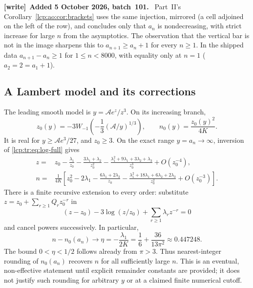 \documentclass[11pt]{article}
\numberwithin{equation}{section}
\theoremstyle{definition}\newtheorem{definition}[theorem]{Definition}
\theoremstyle{remark}\newtheorem{remark}[theorem]{Remark}
\newenvironment{writenote}[1][]{\par\smallskip\begingroup\small
 \noindent\textbf{[write]}\if\relax\detokenize{#1}\relax\else~\textbf{#1.}\fi\ }%
 {\par\endgroup\smallskip}
\begin{document}
\begin{writenote}[Added 5 October 2026, batch~101]
Part~II's Corollary~\ref{lcp:ao:cor:brackets} uses the same injection,
mirrored (a cell adjoined on the left of the row), and concludes only that
$a_n$ is nondecreasing, with strict increase for large $n$ from the
asymptotics. The observation that the vertical bar is not in the image
sharpens this to $a_{n+1}\ge a_n+1$ for every $n\ge1$. In the shipped data
$a_{n+1}-a_n\ge1$ for $1\le n<8000$, with equality only at $n=1$
($a_2=2=a_1+1$).
\end{writenote}


\subsection{A Lambert model and its corrections}
The leading smooth model is $y=\mathcal A e^z/z^3$.  On its increasing branch,
\[
 z_0(y)=-3W_{-1}\left(-\frac13(\mathcal A/y)^{1/3}\right),
 \qquad n_0(y)=\frac{z_0(y)^2}{4K}.
\]
It is real for $y\ge\mathcal A e^3/27$, and $z_0\ge3$.
On the exact range $y=a_n\to\infty$, inversion of \eqref{lcp:tr:eq:log-full} gives
\begin{align*}
 z={}&z_0-\frac{\lambda_1}{z_0}
       -\frac{3\lambda_1+\lambda_2}{z_0^2}
       -\frac{\lambda_1^2+9\lambda_1+3\lambda_2+\lambda_3}{z_0^3}
       +O(z_0^{-4}),\\
 n={}&\frac1{4K}\left[z_0^2-2\lambda_1
       -\frac{6\lambda_1+2\lambda_2}{z_0}
       -\frac{\lambda_1^2+18\lambda_1+6\lambda_2+2\lambda_3}{z_0^2}
       +O(z_0^{-3})\right].
\end{align*}
There is a finite recursive extension to every order: substitute
$z=z_0+\sum_{r\ge1}Q_r z_0^{-r}$ in
\[
 (z-z_0)-3\log(z/z_0)+\sum_{r\ge1}\lambda_r z^{-r}=0
\]
and cancel powers successively. In particular,
\[
 n-n_0(a_n)\longrightarrow
 \eta=-\frac{\lambda_1}{2K}=\frac16+\frac{36}{13\pi^2}
 \approx0.447248.
\]
The bound $0<\eta<1/2$ follows already from $\pi>3$. Thus nearest-integer rounding of $n_0(a_n)$ recovers $n$ for all
sufficiently large $n$. This is an eventual, non-effective statement until
explicit remainder constants are provided; it does not justify such rounding
for arbitrary $y$ or at a claimed finite numerical cutoff.
\end{document}
